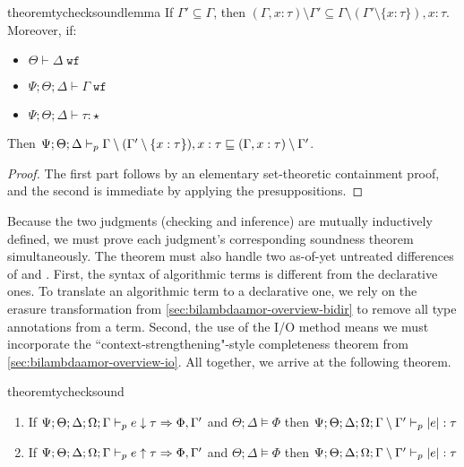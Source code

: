 \begin{restatable}{theorem}{tychecksoundlemma}
\label{thm:tycheck-sound-lemma}
If $\Gamma' \subseteq \Gamma$, then
$(\Gamma, x : \tau) \setminus \Gamma' \subseteq \Gamma \setminus (\Gamma' \setminus \{x : \tau\}), x : \tau$. Moreover, if:
~\begin{itemize}
  \item $\Theta \vdash \Delta \; \texttt{wf}$
  \item $\Psi ; \Theta ; \Delta \vdash \Gamma \; \texttt{wf}$
  \item $\Psi ; \Theta ; \Delta \vdash \tau : \star$
\end{itemize}
Then $\Psi ; \Theta ; \Delta \vdash_p \Gamma \setminus (\Gamma' \setminus \{x : \tau\}), x : \tau \sqsubseteq (\Gamma, x : \tau) \setminus \Gamma'$.
\end{restatable}
\begin{proof}
The first part follows by an elementary set-theoretic containment proof, and the second is immediate by applying the presuppositions.
\end{proof}

Because the two judgments (checking and inference) are mutually inductively defined, we must prove each judgment's corresponding soundness theorem simultaneously. The theorem must also handle two as-of-yet untreated differences of \bilambdaamor and \dlambdaamor. First, the syntax of algorithmic terms is different from the declarative ones. To translate an algorithmic term to a declarative one, we rely on the erasure transformation from \autoref{sec:bilambdaamor-overview-bidir} to remove all type annotations from a term. Second, the use of the I/O method means we must incorporate the ``context-strengthening"-style completeness theorem from \autoref{sec:bilambdaamor-overview-io}. All together, we arrive at the following theorem.

\begin{restatable}{theorem}{tychecksound}
\label{thm:tycheck-sound}
~\begin{enumerate}
 \item If $\Psi;\Theta;\Delta;\Omega;\Gamma \vdash_p e \downarrow \tau \Rightarrow \Phi, \Gamma'$ and $\Theta;\Delta \vDash \Phi$ then $\Psi;\Theta;\Delta;\Omega;\Gamma \setminus \Gamma' \vdash_p |e| : \tau$
 \item If $\Psi;\Theta;\Delta;\Omega;\Gamma \vdash_p e \uparrow \tau \Rightarrow \Phi, \Gamma'$ and $\Theta;\Delta \vDash \Phi$ then $\Psi;\Theta;\Delta;\Omega;\Gamma \setminus \Gamma' \vdash_p |e| : \tau$
\end{enumerate}
\end{restatable}


